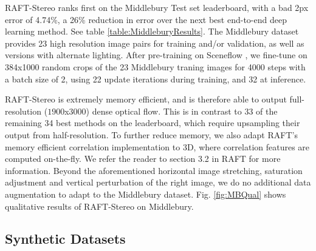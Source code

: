 \documentclass[10pt,twocolumn,letterpaper]{article}
\begin{document}
RAFT-Stereo ranks first on the Middlebury Test set leaderboard, with a bad 2px error of 4.74\%, a 26\% reduction in error over the next best end-to-end deep learning method. See table \ref{table:MiddleburyResults}. The Middlebury dataset provides 23 high resolution image pairs for training and/or validation, as well as versions with alternate lighting. After pre-training on Sceneflow \cite{sceneflow}, we fine-tune on 384x1000 random crops of the 23 Middlebury traning images for 4000 steps with a batch size of 2, using 22 update iterations during training, and 32 at inference.

RAFT-Stereo is extremely memory efficient, and is therefore able to output full-resolution ($1900$x$3000$) dense optical flow. This is in contrast to 33 of the remaining 34 best methods on the leaderboard, which require upsampling their output from half-resolution. To further reduce memory, we also adapt RAFT's memory efficient correlation implementation to 3D, where correlation features are computed on-the-fly. We refer the reader to section 3.2 in RAFT \cite{teed2020raft} for more information. Beyond the aforementioned horizontal image stretching, saturation adjustment and vertical perturbation of the right image, we do no additional data augmentation to adapt to the Middlebury dataset. Fig. \ref{fig:MBQual} shows qualitative results of RAFT-Stereo on Middlebury. 



\subsection{Synthetic Datasets}

\begin{table*}[t]
\centering
{}
\caption{Synthetic data generalization experiments. All experiments were run twice with different weight initializations and the validation performances were averaged. Data were balanced so that each dataset represents an equal proportion of the training data. Experiments were done using RAFT-Stereo with a single hidden-state with random cropping and vertical perturbation of the right image. }
\label{table:syntheticdata}
\end{table*}
\end{document}

